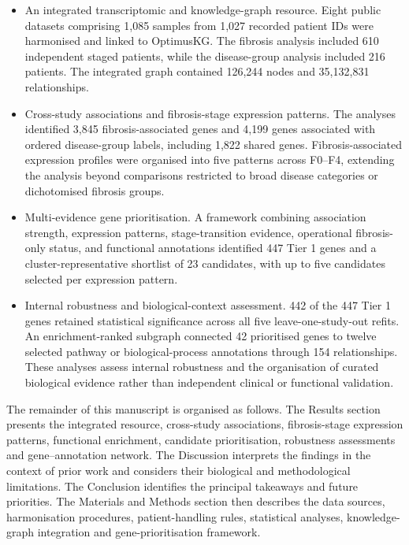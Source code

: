 \documentclass[11pt,a4paper]{article}
\begin{document}
\begin{itemize}
    \item An integrated transcriptomic and knowledge-graph resource. Eight public datasets comprising 1,085 samples from 1,027 recorded patient IDs were harmonised and linked to OptimusKG. The fibrosis analysis included 610 independent staged patients, while the disease-group analysis included 216 patients. The integrated graph contained 126,244 nodes and 35,132,831 relationships.

    \item Cross-study associations and fibrosis-stage expression patterns. The analyses identified 3,845 fibrosis-associated genes and 4,199 genes associated with ordered disease-group labels, including 1,822 shared genes. Fibrosis-associated expression profiles were organised into five patterns across F0--F4, extending the analysis beyond comparisons restricted to broad disease categories or dichotomised fibrosis groups.

    \item Multi-evidence gene prioritisation. A framework combining association strength, expression patterns, stage-transition evidence, operational fibrosis-only status, and functional annotations identified 447 Tier 1 genes and a cluster-representative shortlist of 23 candidates, with up to five candidates selected per expression pattern.

    \item Internal robustness and biological-context assessment. 442 of the 447 Tier 1 genes retained statistical significance across all five leave-one-study-out refits. An enrichment-ranked subgraph connected 42 prioritised genes to twelve selected pathway or biological-process annotations through 154 relationships. These analyses assess internal robustness and the organisation of curated biological evidence rather than independent clinical or functional validation.
\end{itemize}

The remainder of this manuscript is organised as follows. The Results section presents the integrated resource, cross-study associations, fibrosis-stage expression patterns, functional enrichment, candidate prioritisation, robustness assessments and gene--annotation network. The Discussion interprets the findings in the context of prior work and considers their biological and methodological limitations. The Conclusion identifies the principal takeaways and future priorities. The Materials and Methods section then describes the data sources, harmonisation procedures, patient-handling rules, statistical analyses, knowledge-graph integration and gene-prioritisation framework.
\end{document}
